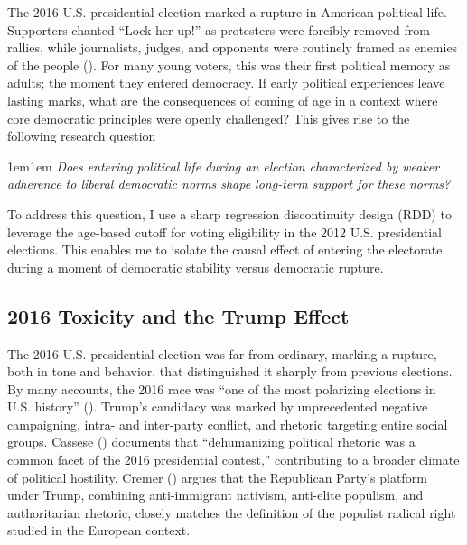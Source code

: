 \documentclass[
  10pt,
  letterpaper,
  DIV=11,
  numbers=noendperiod]{scrartcl}
\begin{document}
The 2016 U.S. presidential election marked a rupture in American
political life. Supporters chanted ``Lock her up!'' as protesters were
forcibly removed from rallies, while journalists, judges, and opponents
were routinely framed as enemies of the people
(). For many young
voters, this was their first political memory as adults; the moment they
entered democracy. If early political experiences leave lasting marks,
what are the consequences of coming of age in a context where core
democratic principles were openly challenged? This gives rise to the
following research question

\begin{adjustwidth}{1em}{1em}
\emph{Does entering political life during an election characterized by weaker adherence to liberal democratic norms shape long-term support for these norms?}
\end{adjustwidth}

To address this question, I use a sharp regression discontinuity design
(RDD) to leverage the age-based cutoff for voting eligibility in the
2012 U.S. presidential elections. This enables me to isolate the causal
effect of entering the electorate during a moment of democratic
stability versus democratic rupture.

\subsection{2016 Toxicity and the Trump
Effect}\label{toxicity-and-the-trump-effect}

The 2016 U.S. presidential election was far from ordinary, marking a
rupture, both in tone and behavior, that distinguished it sharply from
previous elections. By many accounts, the 2016 race was ``one of the
most polarizing elections in U.S. history''
(). Trump's
candidacy was marked by unprecedented negative campaigning, intra- and
inter-party conflict, and rhetoric targeting entire social groups.
Cassese () documents that
``dehumanizing political rhetoric was a common facet of the 2016
presidential contest,'' contributing to a broader climate of political
hostility. Cremer () argues that the
Republican Party's platform under Trump, combining anti-immigrant
nativism, anti-elite populism, and authoritarian rhetoric, closely
matches the definition of the populist radical right studied in the
European context.
\end{document}
